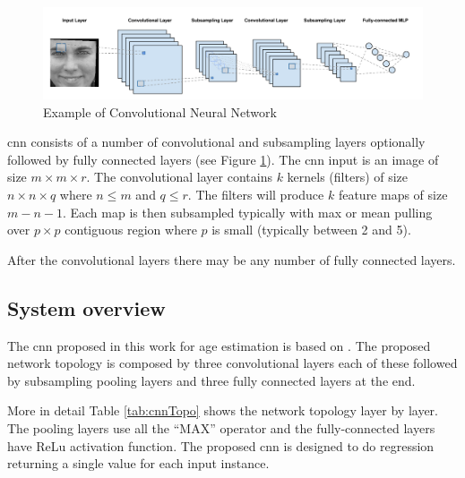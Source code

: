 \begin{figure}[!h]
	\centering
	\includegraphics[width=\textwidth]{figures/CNN_sample}
	\caption{Example of Convolutional Neural Network}
	\label{fig:cnnSample}
\end{figure}

\gls{cnn} consists of a number of convolutional and subsampling layers optionally followed by fully connected layers (see Figure \ref{fig:cnnSample}). The \gls{cnn} input is an image of size $m\times m\times r$. The convolutional layer contains $k$ kernels (filters) of size $n\times n\times q$ where $n \leq m$ and $q \leq r$. The filters will produce $k$ feature maps of size $m - n - 1 $. Each map is then subsampled typically with max or mean pulling over $p\times p$ contiguous region where $p$ is small (typically between 2 and 5).

After the convolutional layers there may be any number of fully connected layers.

\subsection{System overview}

The \gls{cnn} proposed in this work for age estimation is based on \cite{yiage} \cite{yan2014}. The proposed network topology is composed by three convolutional layers each of these followed by subsampling pooling layers and three fully connected layers at the end.

More in detail Table \ref{tab:cnnTopo} shows the network topology layer by layer. The pooling layers use all the ``MAX'' operator and the fully-connected layers have ReLu \cite{conf/icml/NairH10} activation function. The proposed \gls{cnn} is designed to do regression returning a single value for each input instance.

